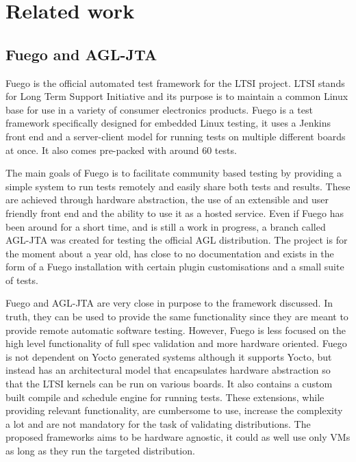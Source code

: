 \section{Related work}

\subsection{Fuego and AGL-JTA}
Fuego is the official automated test framework for the LTSI project. LTSI stands for Long Term Support Initiative and its purpose is to maintain a common Linux base for use in a variety of consumer electronics products. Fuego is a test framework specifically designed for embedded Linux testing, it uses a Jenkins front end and a server-client model for running tests on multiple different boards at once. It also comes pre-packed with around 60 tests. 

The main goals of Fuego is to facilitate community based testing by providing a simple system to run tests remotely and easily share both tests and results. These are achieved through hardware abstraction, the use of an extensible and user friendly front end and the ability to use it as a hosted service. Even if Fuego has been around for a short time, and is still a work in progress, a branch called AGL-JTA was created for testing the official AGL distribution. The project is for the moment about a year old, has close to no documentation and exists in the form of a Fuego installation with certain plugin customisations and a small suite of tests.

Fuego and AGL-JTA are very close in purpose to the framework discussed. In truth, they can be used to provide the same functionality since they are meant to provide remote automatic software testing. However, Fuego is less focused on the high level functionality of full spec validation and more hardware oriented. Fuego is not dependent on Yocto generated systems although it supports Yocto, but instead has an architectural model that encapsulates hardware abstraction so that the LTSI kernels can be run on various boards. It also contains a custom built compile and schedule engine for running tests. These extensions, while providing relevant functionality, are cumbersome to use, increase the complexity a lot and are not mandatory for the task of validating distributions. The proposed frameworks aims to be hardware agnostic, it could as well use only VMs as long as they run the targeted distribution.

